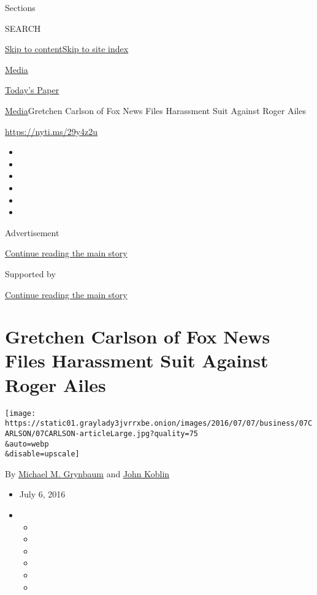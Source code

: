 Sections

SEARCH

\protect\hyperlink{site-content}{Skip to
content}\protect\hyperlink{site-index}{Skip to site index}

\href{https://www.nytimes3xbfgragh.onion/pages/business/media/index.html}{Media}

\href{https://myaccount.nytimes3xbfgragh.onion/auth/login?response_type=cookie\&client_id=vi}{}

\href{https://www.nytimes3xbfgragh.onion/section/todayspaper}{Today's
Paper}

\href{/pages/business/media/index.html}{Media}\textbar{}Gretchen Carlson
of Fox News Files Harassment Suit Against Roger Ailes

\url{https://nyti.ms/29y4z2u}

\begin{itemize}
\item
\item
\item
\item
\item
\item
\end{itemize}

Advertisement

\protect\hyperlink{after-top}{Continue reading the main story}

Supported by

\protect\hyperlink{after-sponsor}{Continue reading the main story}

\hypertarget{gretchen-carlson-of-fox-news-files-harassment-suit-against-roger-ailes}{%
\section{Gretchen Carlson of Fox News Files Harassment Suit Against
Roger
Ailes}\label{gretchen-carlson-of-fox-news-files-harassment-suit-against-roger-ailes}}

\texttt{[image: https://static01.graylady3jvrrxbe.onion/images/2016/07/07/business/07CARLSON/07CARLSON-articleLarge.jpg?quality=75\\\&auto=webp\\\&disable=upscale]}

By
\href{http://www.nytimes3xbfgragh.onion/by/michael-m-grynbaum}{Michael
M. Grynbaum} and
\href{https://www.nytimes3xbfgragh.onion/by/john-koblin}{John Koblin}

\begin{itemize}
\item
  July 6, 2016
\item
  \begin{itemize}
  \item
  \item
  \item
  \item
  \item
  \item
  \end{itemize}
\end{itemize}


